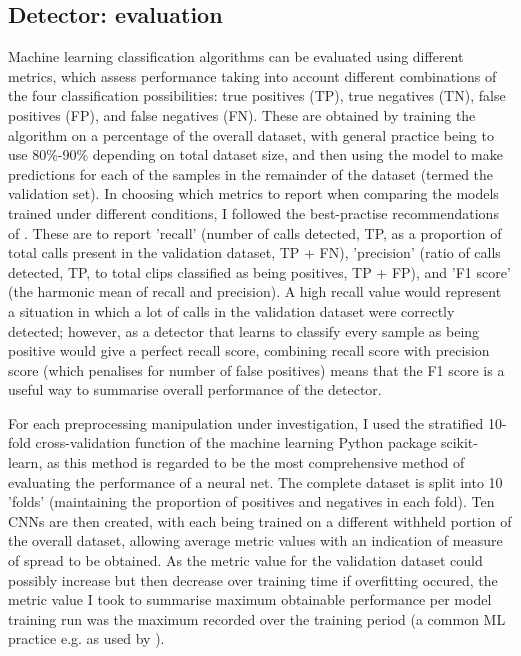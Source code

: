 \documentclass[11pt]{article}
\begin{document}
\subsection{Detector: evaluation}

Machine learning classification algorithms can be evaluated using different metrics, which assess performance taking into account different combinations of the four classification possibilities: true positives (TP), true negatives (TN), false positives (FP), and false negatives (FN). These are obtained by training the algorithm on a percentage of the overall dataset, with general practice being to use 80\%-90\% depending on total dataset size, and then using the model to make predictions for each of the samples in the remainder of the dataset (termed the validation set). In choosing which metrics to report when comparing the models trained under  different conditions, I followed the best-practise recommendations of \cite{knight2017recommendations}. These are to report 'recall' (number of calls detected, TP, as a proportion of total calls present in the validation dataset, TP + FN), 'precision' (ratio of calls detected, TP, to total clips classified as being positives, TP + FP), and 'F1 score' (the harmonic mean of recall and precision). A high recall value would represent a situation in which a lot of calls in the validation dataset were correctly detected; however, as a detector that learns to classify every sample as being positive would give a perfect recall score, combining recall score with precision score (which penalises for number of false positives) means that the F1 score is a useful way to summarise overall performance of the detector. 

For each preprocessing manipulation under investigation, I used the stratified 10-fold cross-validation function of the machine learning Python package scikit-learn, as this method is regarded to be the most comprehensive method of evaluating the performance of a neural net. The complete dataset is split into 10 'folds' (maintaining the proportion of positives and negatives in each fold). Ten CNNs are then created, with each being trained on a different withheld portion of the overall dataset, allowing average metric values with an indication of measure of spread to be obtained. As the metric value for the validation dataset could possibly increase but then decrease over training time if overfitting occured, the metric value I took to summarise maximum obtainable performance per model training run was the maximum recorded over the training period (a common ML practice e.g. as used by \citep{norouzzadeh2018automatically}). 
\end{document}
